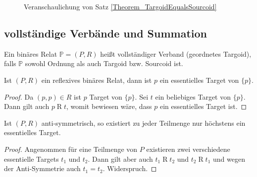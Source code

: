 \documentclass{article}
\begin{document}
\begin{figure}
  \caption{Veranschaulichung von Satz \ref{Theorem_TargoidEqualsSourcoid}}
  \label{fig:TargoidSourcoid}
\end{figure}

\subsection{vollständige Verbände und Summation}

\begin{definition}
  Ein binäres Relat $\mathbb{P} = (P, R)$ heißt vollständiger Verband (geordnetes Targoid), 
  falls $\mathbb{P}$ sowohl Ordnung als auch Targoid bzw. Sourcoid ist.
\end{definition}

\begin{theorem}\label{Theorem_ReflexivesRelat}
  Ist $(P, R)$ ein reflexives binäres Relat, 
  dann ist $p$ ein essentielles Target von $\{p\}$.
\end{theorem}
\begin{proof}
  Da $(p, p) \in R$ ist $p$ Target von $\{p\}$.
  Sei $t$ ein beliebiges Target von $\{p\}$.
  Dann gilt auch $p \mathrel{R} t$, womit bewiesen wäre, dass $p$ ein essentielles Target ist.
\end{proof}

\begin{theorem}\label{Theorem_AntisymmetrischesRelat}
  Ist $(P, R)$ anti-symmetrisch, so existiert zu jeder Teilmenge nur höchstens ein essentielles Target.
\end{theorem}
\begin{proof}
  Angenommen für eine Teilmenge von $P$ existieren zwei verschiedene essentielle Targets $t_1$ und $t_2$.
  Dann gilt aber auch $t_1 \mathrel{R} t_2$ und $t_2 \mathrel{R} t_1$ und wegen der 
  Anti-Symmetrie auch $t_1 = t_2$. Widerspruch.
\end{proof}
\end{document}
